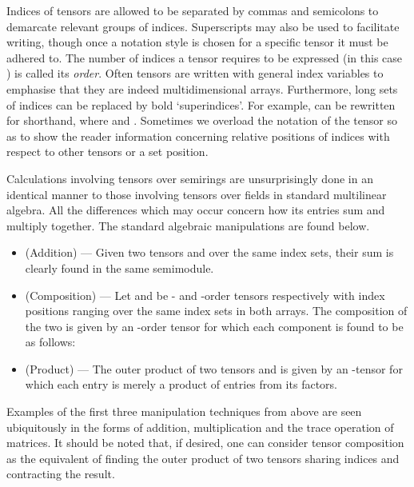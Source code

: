 \documentclass{LMCS}
\theoremstyle{plain}\newtheorem*{cLm}{Claim}
\newcommand{\p}{} \newcommand{\N}{\mathbb{N}}
\newcommand{\hughf}[1]{#1}
\begin{document}
Indices of tensors are allowed to be separated by commas and semicolons to demarcate relevant groups of indices. Superscripts may also be used to facilitate writing, though once a notation style is chosen for a specific tensor it must be adhered to. The number of indices a tensor requires to be expressed (in this case ) is called its \emph{order}. Often tensors are written with general index variables to emphasise that they are indeed multidimensional arrays. Furthermore, long sets of indices can be replaced by bold `superindices'. For example,  can be rewritten  for shorthand, where  and . \hughf{\label{OverloadRef} Sometimes we overload the notation of the tensor so as to show the reader information concerning relative positions of indices with respect to other tensors or a set position.}

\p Calculations involving tensors over semirings are unsurprisingly done in an identical manner to those involving tensors over fields in standard multilinear algebra. All the differences which may occur concern how its entries sum and multiply together. The standard algebraic manipulations are found below.

\begin{itemize}
\item (Addition) --- Given two tensors  and  over the same index sets, their sum is clearly found in the same semimodule.

\item (Composition) --- \hughf{Let  and  be - and -order tensors respectively with  index positions ranging over the same index sets in both arrays.} The composition of the two is given by an -order tensor for which each component is found to be as follows:

\item (Product) --- The outer product of two tensors  and  is given by an -tensor for which each entry is merely a product of entries from its factors.

\end{itemize}

\noindent Examples of the first three manipulation techniques from above are seen ubiquitously in the forms of addition, multiplication and the trace operation of matrices. It should be noted that, if desired, one can consider tensor composition as the equivalent of finding the outer product of two tensors sharing indices and contracting the result.
\end{document}
